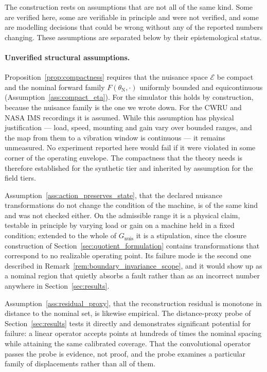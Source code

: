 \documentclass[a4paper]{cas-sc}
\newcommand{\EtaSpace}{\ensuremath{\mathcal{E}}}
\newcommand{\Gnuis}{\ensuremath{G_{\mathrm{nuis}}}}
\begin{document}
The construction rests on assumptions that are not all of the same kind. Some
are verified here, some are verifiable in principle and were not verified, and
some are modelling decisions that could be wrong without any of the reported
numbers changing. These assumptions are separated below by their epistemological status.

\paragraph{Unverified structural assumptions.}
Proposition~\ref{prop:compactness} requires that the nuisance space
\(\EtaSpace\) be compact and the nominal forward family
\(F(\theta_{\mathrm{N}},\cdot)\) uniformly bounded and equicontinuous
(Assumption~\ref{ass:compact_eta}). For the simulator this holds by
construction, because the nuisance family is the one we wrote down. For the
CWRU and NASA IMS recordings it is assumed. While this assumption has physical
justification --- load, speed, mounting and gain vary over bounded ranges, and the
map from them to a vibration window is continuous --- it remains unmeasured.
No experiment reported here would fail if it were
violated in some corner of the operating envelope. The compactness that the
theory needs is therefore established for the synthetic tier and inherited by
assumption for the field tiers.

Assumption~\ref{ass:action_preserves_state}, that the declared nuisance
transformations do not change the condition of the machine, is of the same
kind and was not checked either. On the admissible range it is a physical
claim, testable in principle by varying load or gain on a machine held in a
fixed condition; extended to the whole of \(\Gnuis\) it is a stipulation,
since the closure construction of Section~\ref{sec:quotient_formulation}
contains transformations that correspond to no realizable operating point. Its
failure mode is the second one described in
Remark~\ref{rem:boundary_invariance_scope}, and it would show up as a nominal
region that quietly absorbs a fault rather than as an incorrect number
anywhere in Section~\ref{sec:results}.

Assumption~\ref{ass:residual_proxy}, that the reconstruction residual is
monotone in distance to the nominal set, is likewise empirical. The
distance-proxy probe of Section~\ref{sec:results} tests it directly and
demonstrates significant potential for failure: a linear operator accepts points at hundreds of times
the nominal spacing while attaining the same calibrated coverage. That the
convolutional operator passes the probe is evidence, not proof, and the probe
examines a particular family of displacements rather than all of them.
\end{document}
